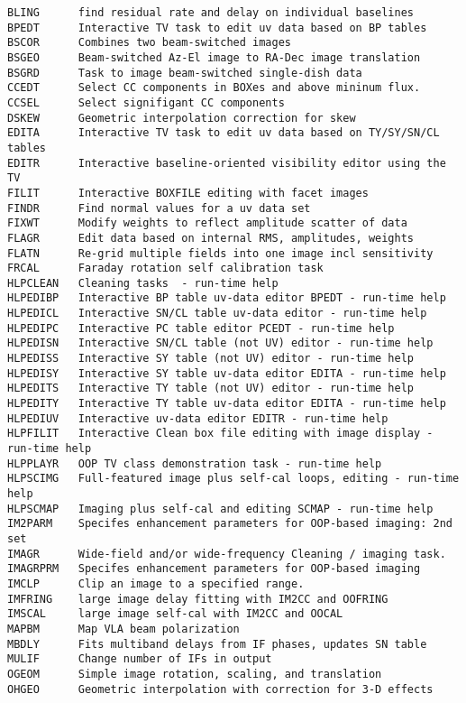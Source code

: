 \vskip 0.5pt
\bbve\begin{verbatim}
BLING      find residual rate and delay on individual baselines
BPEDT      Interactive TV task to edit uv data based on BP tables
BSCOR      Combines two beam-switched images
BSGEO      Beam-switched Az-El image to RA-Dec image translation
BSGRD      Task to image beam-switched single-dish data
CCEDT      Select CC components in BOXes and above mininum flux.
CCSEL      Select signifigant CC components
DSKEW      Geometric interpolation correction for skew
EDITA      Interactive TV task to edit uv data based on TY/SY/SN/CL tables
EDITR      Interactive baseline-oriented visibility editor using the TV
FILIT      Interactive BOXFILE editing with facet images
FINDR      Find normal values for a uv data set
FIXWT      Modify weights to reflect amplitude scatter of data
FLAGR      Edit data based on internal RMS, amplitudes, weights
FLATN      Re-grid multiple fields into one image incl sensitivity
FRCAL      Faraday rotation self calibration task
HLPCLEAN   Cleaning tasks  - run-time help
HLPEDIBP   Interactive BP table uv-data editor BPEDT - run-time help
HLPEDICL   Interactive SN/CL table uv-data editor - run-time help
HLPEDIPC   Interactive PC table editor PCEDT - run-time help
HLPEDISN   Interactive SN/CL table (not UV) editor - run-time help
HLPEDISS   Interactive SY table (not UV) editor - run-time help
HLPEDISY   Interactive SY table uv-data editor EDITA - run-time help
HLPEDITS   Interactive TY table (not UV) editor - run-time help
HLPEDITY   Interactive TY table uv-data editor EDITA - run-time help
HLPEDIUV   Interactive uv-data editor EDITR - run-time help
HLPFILIT   Interactive Clean box file editing with image display - run-time help
HLPPLAYR   OOP TV class demonstration task - run-time help
HLPSCIMG   Full-featured image plus self-cal loops, editing - run-time help
HLPSCMAP   Imaging plus self-cal and editing SCMAP - run-time help
IM2PARM    Specifes enhancement parameters for OOP-based imaging: 2nd set
IMAGR      Wide-field and/or wide-frequency Cleaning / imaging task.
IMAGRPRM   Specifes enhancement parameters for OOP-based imaging
IMCLP      Clip an image to a specified range.
IMFRING    large image delay fitting with IM2CC and OOFRING
IMSCAL     large image self-cal with IM2CC and OOCAL
MAPBM      Map VLA beam polarization
MBDLY      Fits multiband delays from IF phases, updates SN table
MULIF      Change number of IFs in output
OGEOM      Simple image rotation, scaling, and translation
OHGEO      Geometric interpolation with correction for 3-D effects

\end{verbatim}
